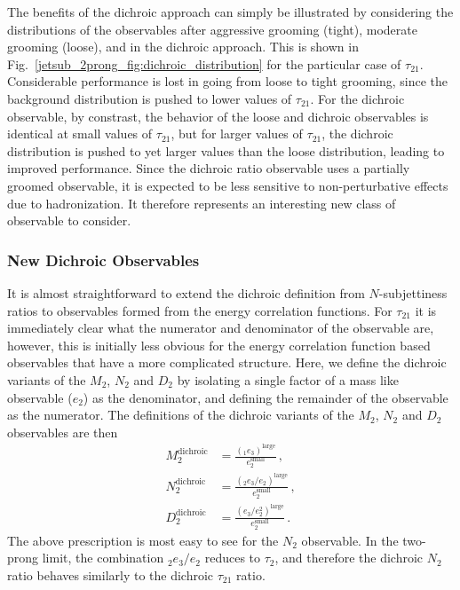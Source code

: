 \documentclass[11pt]{cernrep}
\begin{document}
The benefits of the dichroic approach can simply be illustrated by
considering the distributions of the observables after aggressive
grooming (tight), moderate grooming (loose), and in the dichroic
approach.
%
This is shown in Fig.~\ref{jetsub_2prong_fig:dichroic_distribution} for the particular case of $\tau_{21}$.
%
Considerable performance is lost in going from loose to tight grooming, since the background distribution is pushed to lower values of $\tau_{21}$.
%
For the dichroic observable, by constrast, the behavior of the loose
and dichroic observables is identical at small values of $\tau_{21}$,
but for larger values of $\tau_{21}$, the dichroic distribution is
pushed to yet larger values than the loose distribution, leading to
improved performance.
%
Since the dichroic ratio observable uses a partially groomed
observable, it is expected to be less sensitive to non-perturbative effects due to hadronization.
%
It therefore represents an interesting new class of observable to consider. 

\subsubsection{New Dichroic Observables}\label{jetsub_2prong_sec:dichroic_new}

It is almost straightforward to extend the dichroic definition from $N$-subjettiness ratios to observables formed from the energy correlation functions.
%
For $\tau_{21}$ it is immediately clear what the numerator and denominator of the observable are, however, this is initially less obvious for the energy correlation function based observables that have a more complicated structure.
%
Here, we define the dichroic variants of the $M_2$, $N_2$ and $D_2$ by isolating a single factor of a mass like observable ($e_2$) as the denominator, and defining the remainder of the observable as the numerator.
%
The definitions of the dichroic variants of the $M_2$, $N_2$ and $D_2$
observables are then
\begin{align}
  M_2^{\text{dichroic}}&= \frac{( _1e_{3})^{\text{large}}  }{e_{2}^{\text{small}}}\,, \\
 N_2^{\text{dichroic}}&= \frac{\left( _{2}e_{3} / e_{2} \right)^{\text{large}} }{e_{2}^{\text{small}}}\,,\\
  D_2^{\text{dichroic}}&=\frac{\left( e_{3} / e_{2}^2 \right)^{\text{large}}}{ e_{2}^{\text{small}}}\,.
\end{align}
%
The above prescription is most easy to see for the $N_2$ observable. In the two-prong limit, the combination $ _{2}e_{3} / e_{2} $ reduces to $\tau_2$, and therefore the dichroic $N_2$ ratio behaves similarly to the dichroic $\tau_{21}$ ratio.
\end{document}
